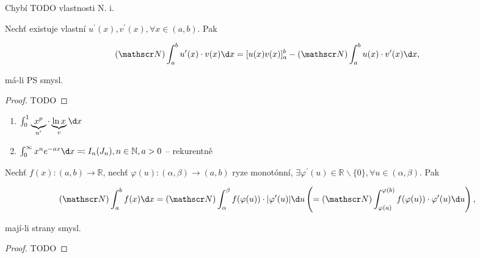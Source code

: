 Chybí TODO vlastnosti N. i.

\begin{veta}
  Nechť existuje vlastní $u^\prime (x), v^\prime (x), \forall x \in (a, b)$. Pak

  $$(\mathscr N)\int_a^b u^\prime (x) \cdot v(x) \d x = [u(x)v(x)]_a^b-(\mathscr N) \int_a^b u(x) \cdot v^\prime(x) \d x,$$

  má-li PS smysl.
\end{veta}

\begin{proof}
  TODO
\end{proof}

\begin{priklad}
  \begin{enumerate}
    \item $\int_0^1 \underbrace{x^p}_{u^\prime} \cdot \underbrace{\ln x}_{v} \d x$
    \item $\int_0^{\infty} x^n e^{-ax} \d x \eqcolon I_n (J_n), n \in \mathbb N, a>0$ -- rekurentně
  \end{enumerate}
\end{priklad}

\begin{veta}
  Nechť $f(x): (a,b) \to \mathbb R$, nechť $\varphi(u): (\alpha, \beta) \to (a,b)$ ryze monotónní, $\exists \varphi^\prime(u) \in \mathbb R \smallsetminus \{0\}, \forall u \in (\alpha, \beta)$. Pak

  $$(\mathscr N) \int_a^b f(x) \d x = (\mathscr N) \int_\alpha^\beta f(\varphi(u))\cdot|\varphi^\prime(u)| \d u \left(= (\mathscr N) \int_{\varphi(a)}^{\varphi (b)} f(\varphi (u)) \cdot \varphi^\prime (u) \d u\right),$$

  mají-li strany smysl.
\end{veta}

\begin{proof}
  TODO
\end{proof}
